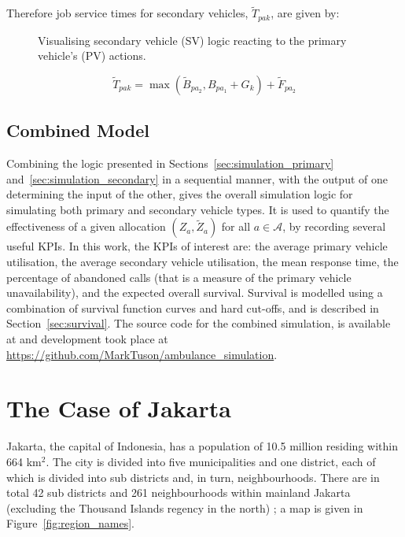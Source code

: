 \documentclass[numbers,webpdf,imaman]{ima-authoring-template}%
\begin{document}
Therefore job service times for secondary vehicles, $\tilde{T}_{pak}$, are
given by:

\begin{figure}
    \centering
    
    \caption{Visualising secondary vehicle (SV) logic reacting to the primary
    vehicle's (PV) actions.}
    \label{fig:sequential_logic}
\end{figure}

\begin{equation}
  \tilde{T}_{pak} = \max\left(\tilde{B}_{pa_2}, B_{pa_1} + G_k \right) + \tilde{F}_{pa_2}
\end{equation}

\subsection{Combined Model}
Combining the logic presented in Sections~\ref{sec:simulation_primary}
and~\ref{sec:simulation_secondary} in a sequential manner, with the output of
one determining the input of the other, gives the overall simulation logic for
simulating both primary and secondary vehicle types. It is used to quantify
the effectiveness of a given allocation $(Z_a, \tilde{Z}_a)$ for all
$a \in \mathcal{A}$, by recording several useful KPIs.
In this work, the KPIs of interest are: the average primary vehicle
utilisation, the average secondary vehicle utilisation, the mean response
time, the percentage of abandoned calls (that is a measure of the primary
vehicle unavailability), and the expected overall survival. Survival is
modelled using a combination of survival function curves and hard cut-offs,
and is described in Section~\ref{sec:survival}.
The source code for the combined simulation, is available at \citet{zenodo_sim} and
development took place at \url{https://github.com/MarkTuson/ambulance_simulation}.




\section{The Case of Jakarta}\label{sec:jakarta}
Jakarta, the capital of Indonesia, has a population of 10.5 million
\citep{BPS_Jakarta} residing within 664 km$^2$. The city is divided into five
municipalities and one district, each of which is divided into sub districts
and, in turn, neighbourhoods. There are in total 42 sub districts and 261
neighbourhoods within mainland Jakarta (excluding the Thousand Islands regency
in the north) \citep{BPS_Jakarta_angka}; a map is given in
Figure~\ref{fig:region_names}. 
\end{document}
